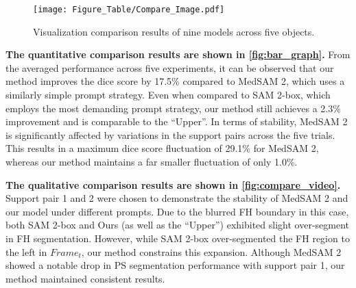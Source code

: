 \begin{figure*}
  \centering
  \setlength{\abovecaptionskip}{3pt}
   \texttt{[image: Figure\_Table/Compare\_Image.pdf]}
   \caption{Visualization comparison results of nine models across five objects.
   }
   \label{fig:compare_Image}
   \vspace{-15pt}
\end{figure*}

{\bf The quantitative comparison results are shown in \cref{fig:bar_graph}.} From the averaged performance across five experiments, it can be observed that our method improves the dice score by 17.5\% compared to MedSAM 2, which uses a similarly simple prompt strategy. Even when compared to SAM 2-box, which employs the most demanding prompt strategy, our method still achieves a 2.3\% improvement and is comparable to the ``Upper''. 
In terms of stability, MedSAM 2 is significantly affected by variations in the support pairs across the five trials. This results in a maximum dice score fluctuation of 29.1\% for MedSAM 2, whereas our method maintains a far smaller fluctuation of only 1.0\%.

{\bf The qualitative comparison results are shown in \cref{fig:compare_video}.} Support pair 1 and 2 were chosen to demonstrate the stability of MedSAM 2 and our model under different prompts. Due to the blurred FH boundary in this case, both SAM 2-box and Ours (as well as the ``Upper'') exhibited slight over-segment in FH segmentation. However, while SAM 2-box over-segmented the FH region to the left in \(Frame_{t}\), our method constrains this expansion. Although MedSAM 2 showed a notable drop in PS segmentation performance with support pair 1, our method maintained consistent results.

